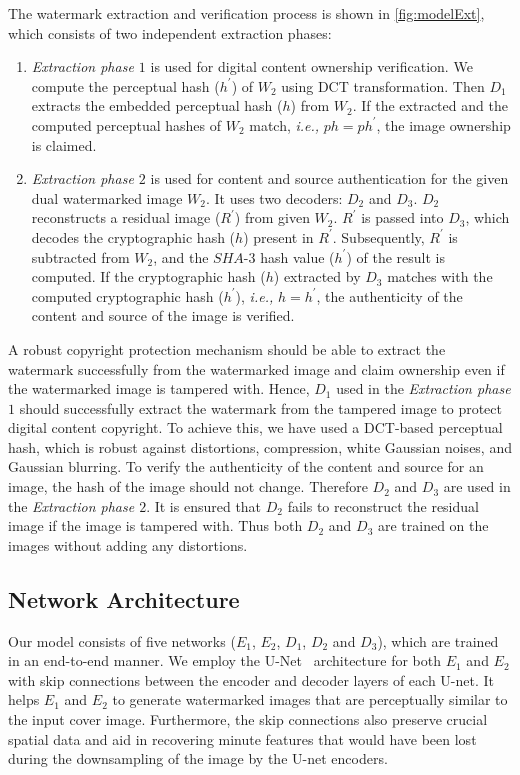 \documentclass[acmsmall, nonacm]{acmart}
\begin{document}
The watermark extraction and verification process is shown in \autoref{fig:modelExt}, which consists of two independent extraction phases:
\begin{enumerate}
  \item {\em Extraction phase $1$} is used for digital content ownership verification. We compute the perceptual hash ($h^\prime$) of $W_2$ using DCT transformation. Then $D_1$ extracts the embedded perceptual hash ($h$) from $W_2$. If the extracted and the computed perceptual hashes of  $W_2$ match, {\em i.e.,} $ph={ph}^\prime$, the image ownership is claimed.
  \item {\em Extraction phase $2$} is used for content and source authentication for the given dual watermarked image $W_2$. It uses two decoders: $D_2$ and $D_3$.  $D_2$  reconstructs a residual image ($R^{\prime}$) from given $W_2$.   $R^{\prime}$ is passed into $D_3$, which decodes the cryptographic hash ($h$) present in $R^{\prime}$. Subsequently, $R^{\prime}$ is subtracted from $W_2$, and the $SHA$-$3$ hash value ($h^\prime$) of the result is computed. If the cryptographic hash ($h$) extracted by  $D_3$ matches with the computed cryptographic hash ($h^\prime$), {\em i.e.,} $h={h}^\prime$, the authenticity of the content and source of the image is verified.
\end{enumerate}

A robust copyright protection mechanism should be able to extract the watermark successfully from the watermarked image and claim ownership even if the watermarked image is tampered with. Hence, $D_1$ used in the {\em Extraction phase $1$} should successfully extract the watermark from the tampered image to protect digital content copyright. To achieve this,  we have used a DCT-based perceptual hash, which is robust against distortions, compression, white Gaussian noises, and Gaussian blurring. To verify the authenticity of the content and source for an image, the hash of the image should not change. Therefore $D_2$ and $D_3$ are used in the {\em Extraction phase $2$}. It is ensured that  $D_2$ fails to reconstruct the residual image if the image is tampered with. Thus both $D_2$ and $D_3$ are trained on the images without adding any distortions.

\subsection{Network Architecture} \label{arch}

Our model consists of five networks ($E_1$, $E_2$, $D_1$, $D_2$ and $D_3$), which are trained in an end-to-end manner. We employ the U-Net~\cite{unet} architecture for both $E_1$ and $E_2$ with skip connections between the encoder and decoder layers of each U-net. It helps $E_1$ and $E_2$ to generate watermarked images that are perceptually similar to the input cover image.  Furthermore, the skip connections also preserve crucial spatial data and aid in recovering minute features that would have been lost during the downsampling of the image by the U-net encoders.
\end{document}
